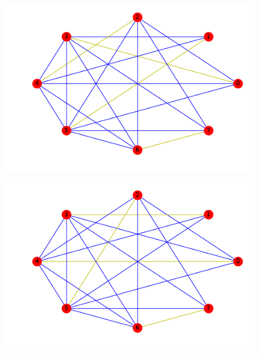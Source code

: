 \documentclass{beamer}
\begin{document}
\begin{frame}
\begin{figure}[h!]
\centering
\includegraphics[scale=0.5]{opt2}
\end{figure}
\end{frame}

\begin{frame}
\begin{figure}[h!]
\centering
\includegraphics[scale=0.5]{opt3}
\end{figure}
\end{frame}
\end{document}
